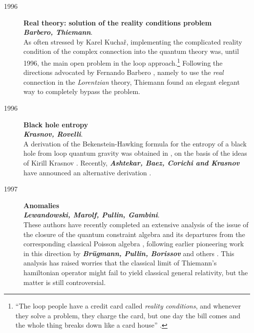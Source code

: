 \documentclass[12pt]{article}
\begin{document}
\begin{description}
    \item[1996] {\bf Real theory: solution of the reality conditions 
    problem\\
    {\em Barbero, Thiemann}}.\\
	As often stressed by Karel Kucha\v{r}, implementing the 
	complicated reality condition of the complex connection into the 
	quantum theory was, until 1996, the main open problem in the loop 
	approach.\footnote{``The loop people have a credit card called 
	{\em reality conditions\/}, and whenever they solve a problem, 
	they charge the card, but one day the bill comes and the whole 
	thing breaks down like a card house'' \cite{kuchar}.} Following 
	the directions advocated by Fernando Barbero 
	\cite{Barbero,Barbero3,Barbero2,Barbero4}, namely to use the {\em 
	real\/} connection in the {\em Lorentzian\/} theory, Thiemann 
	found an elegant elegant way to completely bypass the problem.

	\item[1996] {\bf Black hole entropy\\
	{\em Krasnov, Rovelli}}.\\
	A derivation of the Bekenstein-Hawking formula for the 
	entropy of a black hole from loop quantum gravity was 
	obtained in \cite{Rovelli96}, on the basis of the ideas of 
	Kirill Krasnov \cite{Krasnov,Krasnov2}.  Recently, 
	\textbf{\em Ashtekar, Baez, Corichi and Krasnov} have 
	announced an alternative derivation \cite{AshtekarEtAl97}.

	\item[1997] {\bf  Anomalies\\
	{\em Lewandowski, Marolf, Pullin, Gambini}}.\\
	These authors have recently completed an extensive analysis of the 
	issue of the closure of the quantum constraint algebra and its 
	departures from the corresponding classical Poisson algebra 
	\cite{LewandowskiMarolf,LewandowskiEtAl}, following earlier 
	pioneering work in this direction by \textbf{\em Br\"ugmann, 
	Pullin, Borissov} and others \cite{BruegmannAlgebra,%
	BruegmannPullinAlgebra,GambiniGaratPullin,Borissov97}.  This 
	analysis has raised worries that the classical limit of 
	Thiemann's hamiltonian operator might fail to yield classical 
	general relativity, but the matter is still controversial.


\end{description}
\end{document}
